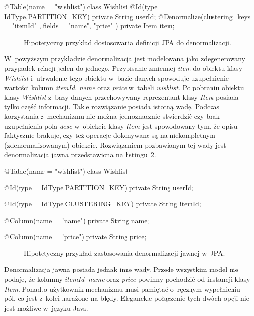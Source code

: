 \begin{verbbox}
	@Table(name = "wishlist")
	class Wishlist {
	    @Id(type = IdType.PARTITION_KEY) 
	    private String userId;
	    @Denormalize(clustering_keys = { "itemId" }, 
	                 fields = { "name", "price" })
	    private Item item;
	}
\end{verbbox}

\begin{figure}[ht!]
	\centering
	\theverbbox
	\caption{Hipotetyczny przykład dostosowania definicji JPA do denormalizacji.}
	\label{vrb:jpa_denormalization_theory}
\end{figure}

W~powyższym przykładzie denormalizacja jest modelowana jako zdegenerowany przypadek relacji jeden-do-jednego. Przypisanie zmiennej \emph{item} do obiektu klasy \emph{Wishlist} i~utrwalenie tego obiektu w~bazie danych spowoduje uzupełnienie wartości kolumn \emph{itemId}, \emph{name} oraz \emph{price} w~tabeli \emph{wishlist}. Po pobraniu obiektu klasy \emph{Wishlist} z~bazy danych przechowywany reprezentant klasy \emph{Item} posiada tylko część informacji. Takie rozwiązanie posiada istotną wadę. Podczas korzystania z~mechanizmu nie można jednoznacznie stwierdzić czy brak uzupełnienia pola \emph{desc} w~obiekcie klasy \emph{Item} jest spowodowany tym, że opisu faktycznie brakuje, czy też operacje dokonywane są na niekompletnym (zdenormalizowanym) obiekcie. Rozwiązaniem pozbawionym tej wady jest denormalizacja jawna przedstawiona na listingu~\ref{vrb:jpa_explicit_denormalization_theory}.

\begin{verbbox}
	@Table(name = "wishlist")
	class Wishlist {
	    @Id(type = IdType.PARTITION_KEY) 
	    private String userId;

	    @Id(type = IdType.CLUSTERING_KEY)
	    private String itemId;

	    @Column(name = "name")
	    private String name;

	    @Column(name = "price")
	    private String price;
	}
\end{verbbox}

\begin{figure}[ht!]
	\centering
	\theverbbox
	\caption{Hipotetyczny przykład zastosowania denormalizacji jawnej w~JPA.}
	\label{vrb:jpa_explicit_denormalization_theory}
\end{figure}

Denormalizacja jawna posiada jednak inne wady. Przede wszystkim model nie podaje, że kolumny \emph{itemId}, \emph{name} oraz \emph{price} powinny pochodzić od instancji klasy \emph{Item}. Ponadto użytkownik mechanizmu musi pamiętać o~ręcznym wypełnieniu pól, co jest z~kolei narażone na błędy. Eleganckie połączenie tych dwóch opcji nie jest możliwe w~języku Java. 

